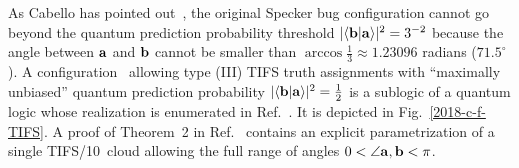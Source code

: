\documentclass[%
  reprint,
  twocolumn,
 showpacs,
 showkeys,
 preprintnumbers,
 amsmath,amssymb,
 aps,
  prl,
  longbibliography,
 ]{revtex4-1}
\begin{document}
\begin{enumerate}
As Cabello has pointed out~\cite{cabello-1994,Cabello-1996-diss}, the original Specker bug configuration cannot go beyond
the quantum prediction probability threshold $\vert \langle {\bf b} \vert {\bf a} \rangle \vert^2 = 3^{-2}$
because the angle between ${\bf a}$ and ${\bf b}$ cannot be smaller than
$\arccos {\frac{1}{3}} \approx 1.23096$ radians ($71.5^\circ$).
A configuration~\cite[Fig.~5(a)]{svozil-2018-whycontexts} allowing type (III) TIFS truth assignments
with ``maximally unbiased''
quantum prediction probability $\vert \langle {\bf b} \vert {\bf a} \rangle \vert^2 = \frac{1}{2}$
is a sublogic of a quantum logic
whose realization is enumerated in Ref.~\cite[Table.~1, p.~102201-7]{2015-AnalyticKS}.
It is depicted in Fig.~\ref{2018-c-f-TIFS}.
A proof of Theorem~2 in Ref.~\cite{Ramanathan-18} contains an explicit parametrization of a single
TIFS/10~cloud allowing the full range of angles $0 < \angle {\bf a},{\bf b} < \pi$.
\begin{figure}
\newif\iflabel \labelfalse
\begin{center}
\end{center}
\end{figure}
\end{enumerate}
\end{document}
